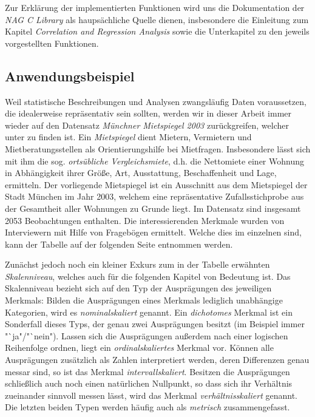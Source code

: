 Zur Erklärung der implementierten Funktionen wird uns die Dokumentation der {\it NAG C Library} als haupsächliche Quelle dienen, insbesondere die Einleitung zum Kapitel {\it Correlation and Regression Analysis} \cite{nag:intro} sowie die Unterkapitel zu den jeweils vorgestellten Funktionen.

\subsection{Anwendungsbeispiel}
\label{sec:beispiel}

Weil statistische Beschreibungen und Analysen zwangsläufig Daten voraussetzen, die idealerweise repräsentativ sein sollten, werden wir in dieser Arbeit immer wieder auf den Datensatz {\it Münchner Mietspiegel 2003} zurückgreifen, welcher unter \cite{Fahrmeir2011} zu finden ist. Ein {\it Mietspiegel} dient Mietern, Vermietern und Mietberatungsstellen als Orientierungshilfe bei Mietfragen. Insbesondere lässt sich mit ihm die sog. {\it ortsübliche Vergleichsmiete}, d.h. die Nettomiete einer Wohnung in Abhängigkeit ihrer Größe, Art, Ausstattung, Beschaffenheit und Lage, ermitteln. Der vorliegende Mietspiegel ist ein Ausschnitt aus dem Mietspiegel der Stadt München im Jahr 2003, welchem eine repräsentative Zufallsstichprobe aus der Gesamtheit aller Wohnungen zu Grunde liegt.  Im Datensatz sind insgesamt 2053 Beobachtungen enthalten. Die interessierenden Merkmale wurden von Interviewern mit Hilfe von Fragebögen ermittelt. Welche dies im einzelnen sind, kann der Tabelle auf der folgenden Seite entnommen werden.

Zunächst jedoch noch ein kleiner Exkurs zum in der Tabelle erwähnten {\it Skalenniveau}, welches auch für die folgenden Kapitel von Bedeutung ist. Das Skalenniveau bezieht sich auf den Typ der Ausprägungen des jeweiligen Merkmals: Bilden die Ausprägungen eines Merkmals lediglich unabhängige Kategorien, wird es {\it nominalskaliert} genannt. Ein {\it dichotomes} Merkmal ist ein Sonderfall dieses Typs, der genau zwei Ausprägungen besitzt (im Beispiel immer "`ja"/"`nein"). Lassen sich die Ausprägungen außerdem nach einer logischen Reihenfolge ordnen, liegt ein {\it ordinalskaliertes} Merkmal vor. Können alle Ausprägungen zusätzlich als Zahlen interpretiert werden, deren Differenzen genau messar sind, so ist das Merkmal {\it intervallskaliert}. Besitzen die Ausprägungen schließlich auch noch einen natürlichen Nullpunkt, so dass sich ihr Verhältnis zueinander sinnvoll messen lässt, wird das Merkmal {\it verhältnisskaliert} genannt. Die letzten beiden Typen werden häufig auch als {\it metrisch} zusammengefasst.\\

